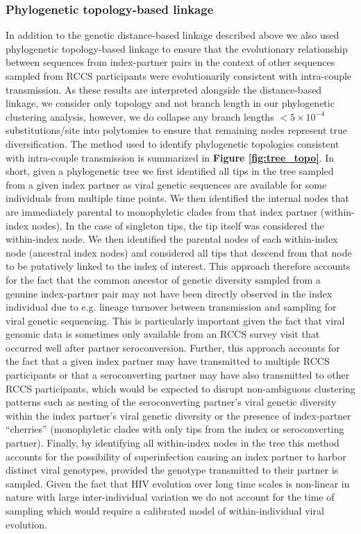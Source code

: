 \documentclass{article}[11pt]
\begin{document}
\subsubsection*{Phylogenetic topology-based linkage}
In addition to the genetic distance-based linkage described above we also used phylogenetic topology-based linkage to ensure that the evolutionary relationship between sequences from index-partner pairs in the context of other sequences sampled from RCCS participants were evolutionarily consistent with intra-couple transmission. As these results are interpreted alongside the distance-based linkage, we consider only topology and not branch length in our phylogenetic clustering analysis, however, we do collapse any branch lengths $<5\times10^{-4}$ substitutions/site into polytomies to ensure that remaining nodes represent true diversification. The method used to identify phylogenetic topologies consistent with intra-couple transmission is summarized in \textbf{Figure \ref{fig:tree_topo}}. In short, given a phylogenetic tree we first identified all tips in the tree sampled from a given index partner as viral genetic sequences are available for some individuals from multiple time points. We then identified the internal nodes that are immediately parental to monophyletic clades from that index partner (within-index nodes). In the case of singleton tips, the tip itself was considered the within-index node. We then identified the parental nodes of each within-index node (ancestral index nodes) and considered all tips that descend from that node to be putatively linked to the index of interest. This approach therefore accounts for the fact that the common ancestor of genetic diversity sampled from a genuine index-partner pair may not have been directly observed in the index individual due to e.g. lineage turnover between transmission and sampling for viral genetic sequencing. This is particularly important given the fact that viral genomic data is sometimes only available from an RCCS survey visit that occurred well after partner seroconversion. Further, this approach accounts for the fact that a given index partner may have transmitted to multiple RCCS participants or that a seroconverting partner may have also transmitted to other RCCS participants, which would be expected to disrupt non-ambiguous clustering patterns such as nesting of the seroconverting partner's viral genetic diversity within the index partner's viral genetic diversity or the presence of index-partner ``cherries'' (monophyletic clades with only tips from the index or seroconverting partner). Finally, by identifying all within-index nodes in the tree this method accounts for the possibility of superinfection causing an index partner to harbor distinct viral genotypes, provided the genotype transmitted to their partner is sampled. Given the fact that HIV evolution over long time scales is non-linear in nature with large inter-individual variation  we do not account for the time of sampling which would require a calibrated model of within-individual viral evolution. \par
\end{document}
